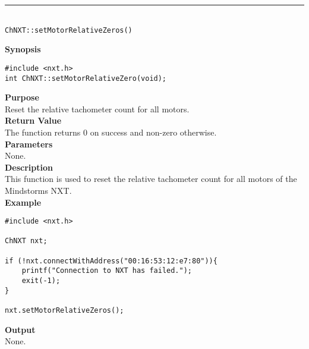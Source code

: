 \noindent
\vspace{5pt}
\rule{4.5in}{0.015in}\\
\noindent
{\LARGE \texttt{ChNXT::setMotorRelativeZeros()} }\\


\noindent
{\bf Synopsis}
\begin{lstlisting}
#include <nxt.h>
int ChNXT::setMotorRelativeZero(void);
\end{lstlisting}

\noindent
{\bf Purpose}\\
Reset the relative tachometer count for all motors.\\

\noindent
{\bf Return Value}\\
The function returns 0 on success and non-zero otherwise.\\

\noindent
{\bf Parameters}\\
None.\\

\noindent
{\bf Description}\\
This function is used to reset the relative tachometer count for 
all motors of the Mindstorms NXT.\\

\noindent
{\bf Example}
\begin{lstlisting}
#include <nxt.h> 

ChNXT nxt;

if (!nxt.connectWithAddress("00:16:53:12:e7:80")){
    printf("Connection to NXT has failed.");
    exit(-1);
}
    
nxt.setMotorRelativeZeros();
\end{lstlisting}

\noindent
{\bf Output}\\
None.\\
\\
